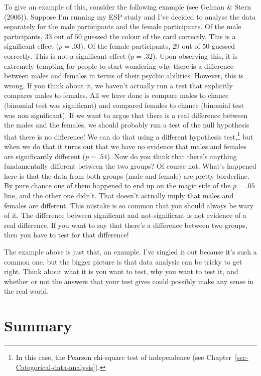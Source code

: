 \documentclass[
  a4paper,
]{book}
\begin{document}
To give an example of this, consider the following example (see Gelman
\& Stern (2006)). Suppose I'm running my ESP study and I've decided to
analyse the data separately for the male participants and the female
participants. Of the male participants, \(33\) out of \(50\) guessed the
colour of the card correctly. This is a significant effect
(\(p = .03\)). Of the female participants, \(29\) out of \(50\) guessed
correctly. This is not a significant effect (\(p = .32\)). Upon
observing this, it is extremely tempting for people to start wondering
why there is a difference between males and females in terms of their
psychic abilities. However, this is wrong. If you think about it, we
haven't actually run a test that explicitly compares males to females.
All we have done is compare males to chance (binomial test was
significant) and compared females to chance (binomial test was non
significant). If we want to argue that there is a real difference
between the males and the females, we should probably run a test of the
null hypothesis that there is no difference! We can do that using a
different hypothesis test,\footnote{In this case, the Pearson chi-square
  test of independence (see
  Chapter~\ref{sec-Categorical-data-analysis}).} but when we do that it
turns out that we have no evidence that males and females are
significantly different (\(p = .54\)). Now do you think that there's
anything fundamentally different between the two groups? Of course not.
What's happened here is that the data from both groups (male and female)
are pretty borderline. By pure chance one of them happened to end up on
the magic side of the \(p = .05\) line, and the other one didn't. That
doesn't actually imply that males and females are different. This
mistake is so common that you should always be wary of it. The
difference between significant and not-significant is not evidence of a
real difference. If you want to say that there's a difference between
two groups, then you have to test for that difference!

The example above is just that, an example. I've singled it out because
it's such a common one, but the bigger picture is that data analysis can
be tricky to get right. Think about what it is you want to test, why you
want to test it, and whether or not the answers that your test gives
could possibly make any sense in the real world.

\hypertarget{summary-7}{%
\section{Summary}\label{summary-7}}
\end{document}

